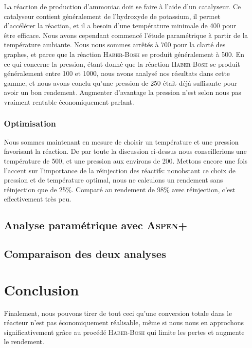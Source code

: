 La réaction de production d'ammoniac doit se faire à l'aide d'un catalyseur. Ce catalyseur contient généralement de
l'hydroxyde de potassium, il permet d'accélérer la réaction, et il a besoin d'une température minimale de \unit{400}{\celsius}
pour être efficace. Nous avons cependant commencé l'étude paramétrique à partir de la température ambiante. Nous nous sommes
arrêtés à \unit{700}{\celsius} pour la clarté des graphes, et parce que la réaction \textsc{Haber-Bosh} se produit généralement à \unit{500}{\celsius}.
En ce qui concerne la pression, étant donné que la réaction \textsc{Haber-Bosh} se produit généralement entre \unit{100}{\bbar} et \unit{1000}{\bbar},
nous avons analysé nos résultats dans cette gamme, et nous avons conclu qu'une pression de \unit{250}{\bbar} était déjà
suffisante pour avoir un bon rendement. Augmenter d'avantage la pression n'est selon nous pas vraiment rentable économiquement parlant.


\subsection{Optimisation}
Nous sommes maintenant en mesure de choisir un température et une pression favorisant la réaction. De par
toute la discussion ci-dessus nous conseillerions une température de \unit{500}{\celsius}, et une pression aux environs de \unit{200}{\bbar}. Mettons encore une fois l'accent sur l'importance de la réinjection des réactifs: nonobstant ce choix de pression et de température optimal, nous ne calculons un rendement sans réinjection que de 25\%. Comparé au rendement de 98\% avec réinjection, c'est effectivement très peu.


\section{Analyse paramétrique avec \textsc{Aspen+}}
\section{Comparaison des deux analyses}

\chapter{Conclusion} Finalement, nous pouvons tirer de tout ceci qu'une conversion totale dans le réacteur n'est
pas économiquement réalisable, même si nous nous en approchons significativement grâce au procédé \textsc{Haber-Bosh} qui limite les pertes et augmente le rendement.


